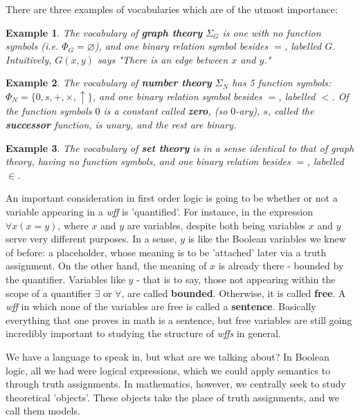 \documentclass{article}
\theoremstyle{definition}
\theoremstyle{plain}
\newtheorem{example}{Example}[section]
\theoremstyle{theorem}
\begin{document}
There are three examples of vocabularies which are of the utmost importance:
\begin{example}
    The vocabulary of \textbf{graph theory} $\Sigma_G$ is one with no function symbols (i.e. $\Phi_G = \varnothing$), and one binary relation symbol besides $=$, labelled $G$. Intuitively, $G(x,y)$ says "There is an edge between $x$ and $y$."
\end{example}
\begin{example}
    The vocabulary of \textbf{number theory} $\Sigma_N$ has 5 function symbols: $\Phi_N = \{0,s,+,\times,\uparrow\}$, and one binary relation symbol besides $=$, labelled $<$. Of the function symbols $0$ is a constant called \textbf{zero}, (so $0$-ary), $s$, called the \textbf{successor} function, is unary, and the rest are binary.
\end{example}
\begin{example}
    The vocabulary of \textbf{set theory} is in a sense identical to that of graph theory, having no function symbols, and one binary relation besides $=$, labelled $\in$. 
\end{example}
An important consideration in first order logic is going to be whether or not a variable appearing in a \textit{wff} is 'quantified'. For instance, in the expression $\forall x (x=y)$, where $x$ and $y$ are variables, despite both being variables $x$ and $y$ serve very different purposes. In a sense, $y$ is like the Boolean variables we knew of before: a placeholder, whose meaning is to be 'attached' later via a truth assignment. On the other hand, the meaning of $x$ is already there - bounded by the quantifier. Variables like $y$ - that is to say, those not appearing within the scope of a quantifier $\exists$ or $\forall$, are called \textbf{bounded}. Otherwise, it is called \textbf{free}. A \textit{wff} in which none of the variables are free is called a \textbf{sentence}. Basically everything that one proves in math is a sentence, but free variables are still going incredibly important to studying the structure of \textit{wffs} in general. 
\par We have a language to speak in, but what are we talking about? In Boolean logic, all we had were logical expressions, which we could apply semantics to through truth assignments. In mathematics, however, we centrally seek to study theoretical 'objects'. These objects take the place of truth assignments, and we call them models.
\end{document}

